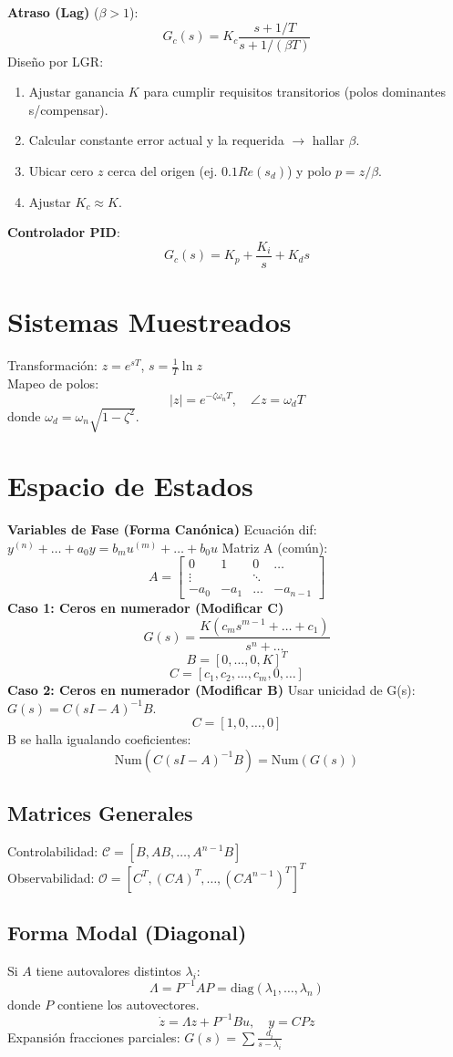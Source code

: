 \documentclass[legalpaper,twocolumn]{article}
\begin{document}
\textbf{Atraso (Lag)} ($\beta > 1$):
\[ G_c(s) = K_c \frac{s + 1/T}{s + 1/(\beta T)} \]
Diseño por LGR:
\begin{enumerate}[leftmargin=*,nosep]
    \item Ajustar ganancia $K$ para cumplir requisitos transitorios (polos dominantes s/compensar).
    \item Calcular constante error actual y la requerida $\to$ hallar $\beta$.
    \item Ubicar cero $z$ cerca del origen (ej. $0.1 Re(s_d)$) y polo $p = z/\beta$.
    \item Ajustar $K_c \approx K$.
\end{enumerate}

\textbf{Controlador PID}:
\[ G_c(s) = K_p + \frac{K_i}{s} + K_d s \]

\section*{Sistemas Muestreados}
Transformación: \( z = e^{sT} \), \( s = \frac{1}{T} \ln z \) \\
Mapeo de polos:
\[ |z| = e^{-\zeta \omega_n T}, \quad \angle z = \omega_d T \]
donde $\omega_d = \omega_n \sqrt{1-\zeta^2}$.

\section*{Espacio de Estados}
\textbf{Variables de Fase (Forma Canónica)}
Ecuación dif: \( y^{(n)} + \dots + a_0 y = b_m u^{(m)} + \dots + b_0 u \)
Matriz A (común):
\[
A = \begin{bmatrix}
0 & 1 & 0 & \dots \\
\vdots & & \ddots & \\
-a_0 & -a_1 & \dots & -a_{n-1}
\end{bmatrix}
\]
\textbf{Caso 1: Ceros en numerador (Modificar C)}
\[ G(s) = \frac{K(c_m s^{m-1} + \dots + c_1)}{s^n + \dots} \]
\[ B = [0, \dots, 0, K]^T \]
\[ C = [c_1, c_2, \dots, c_m, 0, \dots] \]
\textbf{Caso 2: Ceros en numerador (Modificar B)}
Usar unicidad de G(s): $G(s) = C(sI-A)^{-1}B$.
\[ C = [1, 0, \dots, 0] \]
B se halla igualando coeficientes:
\[ \text{Num}(C(sI-A)^{-1}B) = \text{Num}(G(s)) \]

\subsection*{Matrices Generales}
Controlabilidad: $\mathcal{C} = [B, AB, \dots, A^{n-1}B]$ \\
Observabilidad: $\mathcal{O} = [C^T, (CA)^T, \dots, (CA^{n-1})^T]^T$

\subsection*{Forma Modal (Diagonal)}
Si $A$ tiene autovalores distintos $\lambda_i$:
\[ \Lambda = P^{-1} A P = \text{diag}(\lambda_1, \dots, \lambda_n) \]
donde $P$ contiene los autovectores.
\[ \dot{z} = \Lambda z + P^{-1} B u , \quad y = C P z \]
Expansión fracciones parciales: $G(s) = \sum \frac{d_i}{s-\lambda_i}$
\end{document}
